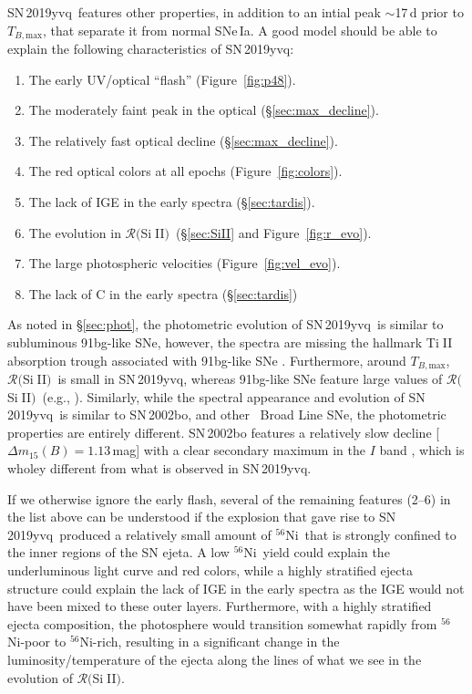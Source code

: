 \documentclass[twocolumn]{aastex63}
\def\ion#1#2{#1$\;${\footnotesize\rm{#2}}\relax}
\newcommand{\tbmax}{$T_{B,\mathrm{max}}$}
\newcommand{\RSiII}{$\mathcal{R}($\ion{Si}{II}$)$}
\newcommand{\radni}{$^{56}$Ni}
\newcommand{\sn}{SN\,2019yvq}
\begin{document}
\sn\ features other properties, in addition to an intial peak $\sim$17\,d
prior to \tbmax, that separate it from normal SNe\,Ia. A good model should be
able to explain the following characteristics of \sn:
%
\begin{enumerate}
    \item The early UV/optical ``flash'' (Figure~\ref{fig:p48}).
    \item The moderately faint peak in the optical (\S\ref{sec:max_decline}). 
    \item The relatively fast optical decline (\S\ref{sec:max_decline}). 
    \item The red optical colors at all epochs (Figure~\ref{fig:colors}). 
    \item The lack of IGE in the early spectra (\S\ref{sec:tardis}).
    \item The evolution in \RSiII\ (\S\ref{sec:SiII} and Figure~\ref{fig:r_evo}).
    \item The large photospheric velocities (Figure~\ref{fig:vel_evo}).
    \item The lack of C in the early spectra (\S\ref{sec:tardis})
\end{enumerate}
%
As noted in \S\ref{sec:phot}, the photometric evolution of \sn\ is similar to
subluminous 91bg-like SNe, however, the spectra are missing the hallmark
\ion{Ti}{II} absorption trough associated with 91bg-like SNe
\citep{Filippenko92}. Furthermore, around \tbmax, \RSiII\ is small in \sn,
whereas 91bg-like SNe feature large values of \RSiII\ (e.g.,
\citealt{Nugent95,Branch09}). Similarly, while the spectral appearance and
evolution of \sn\ is similar to SN\,2002bo, and other
\citeauthor{Branch06}~Broad Line SNe, the photometric properties are entirely
different. SN\,2002bo features a relatively slow decline [$\Delta{m}_{15}(B) =
1.13$\,mag] with a clear secondary maximum in the $I$ band \citep{Benetti04},
which is wholey different from what is observed in \sn.

If we otherwise ignore the early flash, several of the remaining features
(2--6) in the list above can be understood if the explosion that gave rise to
\sn\ produced a relatively small amount of \radni\ that is strongly confined
to the inner regions of the SN ejeta. A low \radni\ yield could explain the
underluminous light curve and red colors, while a highly stratified ejecta
structure could explain the lack of IGE in the early spectra as the IGE would
not have been mixed to these outer layers. Furthermore, with a highly
stratified ejecta composition, the photosphere would transition somewhat
rapidly from \radni-poor to \radni-rich, resulting in a significant change in
the luminosity/temperature of the ejecta along the lines of what we see in the
evolution of \RSiII.
\end{document}
